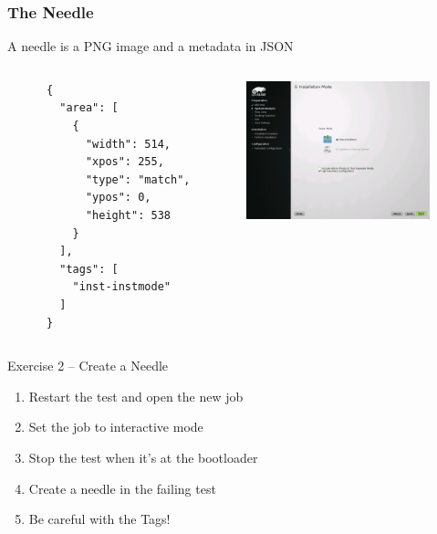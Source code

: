 \documentclass{beamer}
\begin{document}
%
%
\begin{frame}[fragile]
  \frametitle{The Needle}
  A needle is a PNG image and a metadata in JSON
  \begin{columns}
    \begin{column}{0.45\textwidth}
    \lstset{style=mybash}
    \begin{lstlisting}
      {
        "area": [
          {
            "width": 514,
            "xpos": 255,
            "type": "match",
            "ypos": 0,
            "height": 538
          }
        ],
        "tags": [
          "inst-instmode"
        ]
      }
    \end{lstlisting}
    \end{column}

    \begin{column}{0.45\textwidth}
      \includegraphics[height=4cm,width=5.33cm]{needle}
    \end{column}
  \end{columns}
\end{frame}

%
%
\begin{frame}{Exercise 2 -- Create a Needle}
  \begin{enumerate}
  \item Restart the test and open the new job
  \item Set the job to interactive mode
  \item Stop the test when it's at the bootloader
  \item Create a needle in the failing test
  \item Be careful with the Tags!
  \end{enumerate}
\end{frame}
\end{document}
